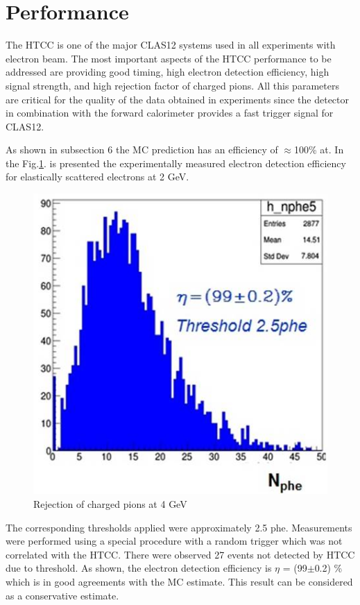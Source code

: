 \section{Performance}The HTCC is one of the major CLAS12 systems used in all experiments with electron beam. The most important aspects of the HTCC performance to be addressed are providing good timing, high electron detection efficiency, high signal strength, and high rejection factor of charged pions. All this parameters are critical for the quality of the data obtained in experiments since the detector in combination with the forward calorimeter provides a fast trigger signal for CLAS12. 

As shown in subsection 6 the MC prediction has an efficiency of $\approx$100\% at. In the Fig.\ref{fig:RAFO_2GeV}. is presented the experimentally measured electron detection efficiency for elastically scattered electrons at 2 GeV. 

\begin{figure}[!h]
    \centering
    \includegraphics[width=1.0\linewidth,trim={0.0cm 0.0cm 0.0cm 0.0cm},clip]{images/RAFO_2GeV.jpg}
    \caption{Rejection of charged pions at 4 GeV}
    \label{fig:RAFO_2GeV}
\end{figure}

The corresponding thresholds applied were approximately 2.5 phe. Measurements were performed using a special procedure with a random trigger which was not correlated with the HTCC. There were observed 27 events not detected by HTCC due to threshold. As shown, the electron detection efficiency is $\eta$ = (99$\pm$0.2) \% which is in good agreements with the MC estimate. This result can be considered as a conservative estimate.

